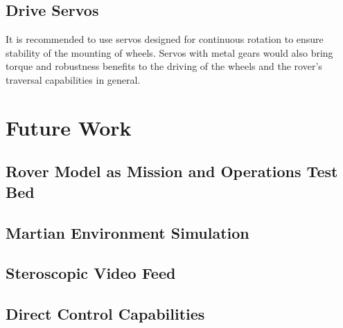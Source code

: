     \subsection{Drive Servos}
      It is recommended to use servos designed for continuous rotation to ensure stability of the mounting of wheels. Servos with metal gears would also bring torque and robustness benefits to the driving of the wheels and the rover's traversal capabilities in general.
      
  \section{Future Work}
    \subsection{Rover Model as Mission and Operations Test Bed}
    \subsection{Martian Environment Simulation}
    \label{subsec:fut-martianEnvironmentSimulation}
    \subsection{Steroscopic Video Feed}
    \subsection{Direct Control Capabilities}